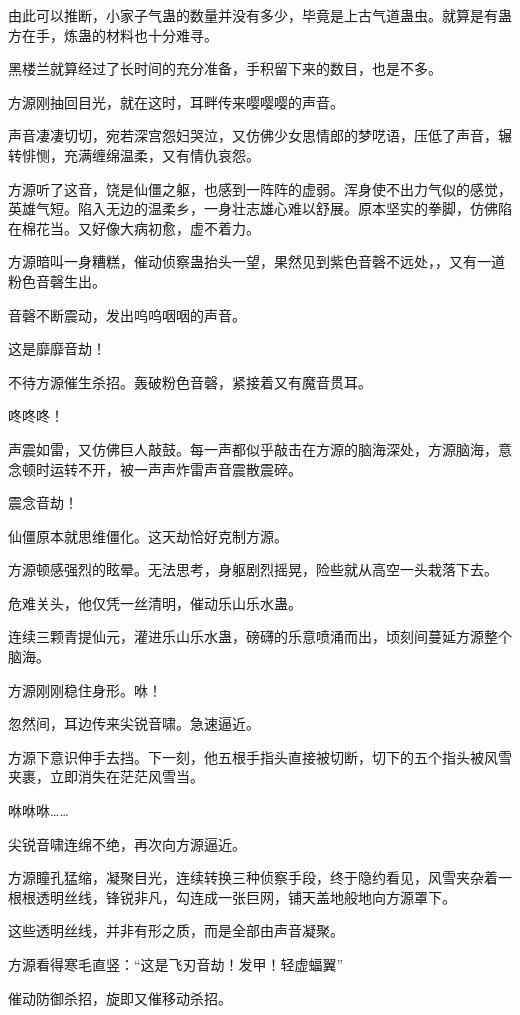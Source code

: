 \begin{this_body}
由此可以推断，小家子气蛊的数量并没有多少，毕竟是上古气道蛊虫。就算是有蛊方在手，炼蛊的材料也十分难寻。

黑楼兰就算经过了长时间的充分准备，手积留下来的数目，也是不多。

方源刚抽回目光，就在这时，耳畔传来嘤嘤嘤的声音。

声音凄凄切切，宛若深宫怨妇哭泣，又仿佛少女思情郎的梦呓语，压低了声音，辗转悱恻，充满缠绵温柔，又有情仇哀怨。

方源听了这音，饶是仙僵之躯，也感到一阵阵的虚弱。浑身使不出力气似的感觉，英雄气短。陷入无边的温柔乡，一身壮志雄心难以舒展。原本坚实的拳脚，仿佛陷在棉花当。又好像大病初愈，虚不着力。

方源暗叫一身糟糕，催动侦察蛊抬头一望，果然见到紫色音磬不远处，，又有一道粉色音磬生出。

音磬不断震动，发出呜呜咽咽的声音。

这是靡靡音劫！

不待方源催生杀招。轰破粉色音磬，紧接着又有魔音贯耳。

咚咚咚！

声震如雷，又仿佛巨人敲鼓。每一声都似乎敲击在方源的脑海深处，方源脑海，意念顿时运转不开，被一声声炸雷声音震散震碎。

震念音劫！

仙僵原本就思维僵化。这天劫恰好克制方源。

方源顿感强烈的眩晕。无法思考，身躯剧烈摇晃，险些就从高空一头栽落下去。

危难关头，他仅凭一丝清明，催动乐山乐水蛊。

连续三颗青提仙元，灌进乐山乐水蛊，磅礴的乐意喷涌而出，顷刻间蔓延方源整个脑海。

方源刚刚稳住身形。咻！

忽然间，耳边传来尖锐音啸。急速逼近。

方源下意识伸手去挡。下一刻，他五根手指头直接被切断，切下的五个指头被风雪夹裹，立即消失在茫茫风雪当。

咻咻咻……

尖锐音啸连绵不绝，再次向方源逼近。

方源瞳孔猛缩，凝聚目光，连续转换三种侦察手段，终于隐约看见，风雪夹杂着一根根透明丝线，锋锐非凡，勾连成一张巨网，铺天盖地般地向方源罩下。

这些透明丝线，并非有形之质，而是全部由声音凝聚。

方源看得寒毛直竖：“这是飞刃音劫！发甲！轻虚蝠翼”

催动防御杀招，旋即又催移动杀招。


\end{this_body}
